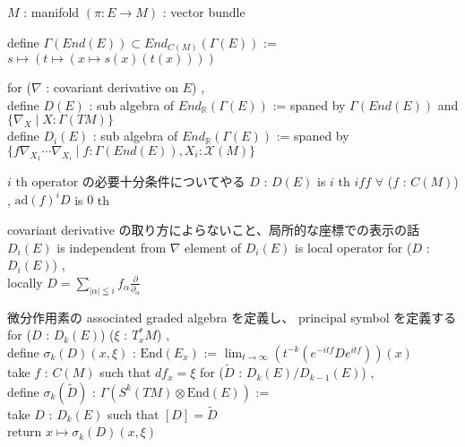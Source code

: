 \begin{When}
\itemwhen \(M\) : manifold
\itemwhen \((\pi : E \to M)\) : vector bundle
\end{When}

\begin{Definition}
\itemdefi
  define \(\Gamma(End(E)) \subset End_{C(M)}(\Gamma(E))\) := \(s \mapsto (t \mapsto (x \mapsto s(x)(t(x))))\)
\end{Definition}

\begin{Definition}
\itemdefi
  for (\(\nabla\) : covariant derivative on \(E\)) ,\\
  define \(D(E)\) : sub algebra of \(End_{\mathbb{R}}(\Gamma(E))\) :=
  spaned by \(\Gamma(End(E))\) and \(\{\nabla_X \mid X : \Gamma(TM)\}\) \\
  define \(D_i(E)\) : sub algebra of \(End_{\mathbb{R}}(\Gamma(E))\) :=
  spaned by \(\{f \nabla_{X_1} \cdots \nabla_{X_i} \mid f : \Gamma(End(E)) , X_i : \mathcal{X}(M)\}\) \\
\end{Definition}

\begin{Theorem}
\itemnote
  \(i\) th operator の必要十分条件についてやる
\itemdefi
  \(D\) : \(D(E)\) is \(i\) th \(iff\) \(\forall\) (\(f\) : \(C(M)\)) , \(\text{ad}(f) ^i D\) is \(0\) th
\end{Theorem}

\begin{Theorem}
\itemnote
  covariant derivative の取り方によらないこと、局所的な座標での表示の話
\itemprop
  \(D_i(E)\) is independent from \(\nabla\)
\itemprop
  element of \(D_i(E)\) is local operator
\itemprop
  for (\(D\) : \(D_i(E)\)) ,\\
  locally \(D = \sum_{\left| \alpha \right| \leqq i} f_{\alpha} \frac{\partial}{\partial_{\alpha}}\)
\end{Theorem}

\begin{Definition}
\itemnote
  微分作用素の associated graded algebra を定義し、 principal symbol を定義する
\itemdefi
  for (\(D\) : \(D_k(E)\)) (\(\xi\) : \(T^*_x M\)) ,\\
  define \(\sigma_k(D)(x , \xi)\) : \(\text{End}(E_x)\) :=
  \(\lim_{t \to \infty} (t^{-k}(e^{-itf} D e^{itf}))(x)\) \\
  take \(f\) : \(C(M)\) such that \(df_x = \xi\)
\itemdefi
  for (\(\tilde{D}\) : \(D_k(E) / D_{k - 1}(E)\)) ,\\
  define \(\sigma_k(\tilde{D})\) : \(\Gamma(S^k(TM) \otimes \text{End}(E))\) := \\
  take \(D\) : \(D_k(E)\) such that \([D] = \tilde{D}\) \\
  return \(x \mapsto \sigma_k(D)(x , \xi)\)
\end{Definition}


